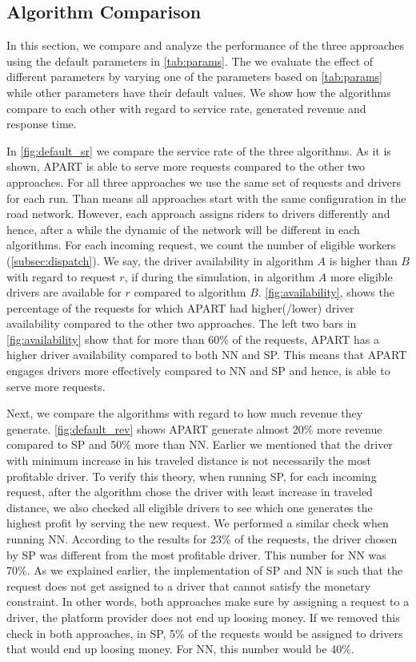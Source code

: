 \subsection{Algorithm Comparison}
In this section, we compare and analyze the performance of the three approaches using the default parameters in \cref{tab:params}. The we evaluate the effect of different parameters by varying one of the parameters based on \cref{tab:params} while other parameters have their default values. We show how the algorithms compare to each other with regard to service rate, generated revenue and response time.

In \cref{fig:default_sr} we compare the service rate of the three algorithms. As it is shown, APART is able to serve more requests compared to the other two approaches. For all three approaches we use the same set of requests and drivers for each run. Than means all approaches start with the same configuration in the road network. However, each approach assigns riders to drivers differently and hence, after a while the dynamic of the network will be different in each algorithms. For each incoming request, we count the number of eligible workers (\cref{subsec:dispatch}). We say, the driver availability in algorithm $A$ is higher than $B$ with regard to request $r$, if during the simulation, in algorithm $A$ more eligible drivers are available for $r$ compared to algorithm $B$. \cref{fig:availability}, shows the percentage of the requests for which APART had higher(/lower) driver availability compared to the other two approaches. The left two bars in \cref{fig:availability} show that for more than 60\% of the requests, APART has a higher driver availability compared to both NN and SP. This means that APART engages drivers more effectively compared to NN and SP and hence, is able to serve more requests.

Next, we compare the algorithms with regard to how much revenue they generate. \cref{fig:default_rev} shows APART generate almost 20\% more revenue compared to SP and 50\% more than NN. Earlier we mentioned that the driver with minimum increase in his traveled distance is not necessarily the most profitable driver. To verify this theory, when running SP, for each incoming request, after the algorithm chose the driver with least increase in traveled distance, we also checked all eligible drivers to see which one generates the highest profit by serving the new request. We performed a similar check when running NN. According to the results for 23\% of the requests, the driver chosen by SP was different from the most profitable driver. This number for NN was 70\%. As we explained earlier, the implementation of SP and NN is such that the request does not get assigned to a driver that cannot satisfy the monetary constraint. In other words, both approaches make sure by assigning a request to a driver, the platform provider does not end up loosing money. If we removed this check in both approaches, in SP, 5\% of the requests would be assigned to drivers that would end up loosing money. For NN, this number would be 40\%.

